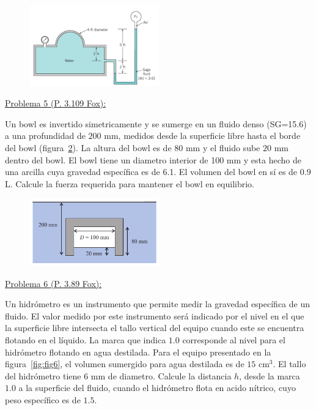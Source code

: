 \documentclass[11pt]{report}
\begin{document}
\begin{figure}[H]
\centering\includegraphics[width=0.5\textwidth]{p4.png}
\caption{\label{fig:fig4} }
\end{figure}




\vspace{0.5cm}
\underline {Problema 5 (P. 3.109 Fox):}
\vspace{0.2cm}

Un bowl es invertido simetricamente y se sumerge en un fluido denso (SG=15.6) a una profundidad de $200$ mm, medidos desde la superficie libre hasta el borde del bowl (figura~\ref{fig:fig5}). La altura del bowl es de $80$ mm y el fluido sube $20$ mm dentro del bowl. El bowl tiene un diametro interior de 100 mm y esta hecho de una arcilla cuya gravedad espec\'ifica es de 6.1. El volumen del bowl en s\'i es de 0.9 L. Calcule la fuerza requerida para mantener el bowl en equilibrio. 

\begin{figure}[H]
\centering\includegraphics[width=0.5\textwidth]{p5.png}
\caption{\label{fig:fig5} }
\end{figure}

\newpage

\vspace{0.5cm}
\underline {Problema 6 (P. 3.89 Fox):}
\vspace{0.2cm}

Un hidr\'ometro es un instrumento que permite medir la gravedad espec\'ifica de un fluido. El valor medido por este instrumento ser\'a indicado por el nivel en el que la superficie libre intersecta el tallo vertical del equipo cuando este se encuentra flotando en el l\'iquido. La marca que indica $1.0$ corresponde al nivel para el hidr\'ometro flotando en agua destilada. Para el equipo presentado en la figura~\ref{fig:fig6}, el volumen sumergido para agua destilada es de $15$ cm$^3$. El tallo del hidr\'ometro tiene $6$ mm de diametro. Calcule la distancia $h$, desde la marca $1.0$ a la superficie del fluido, cuando el hidr\'ometro flota en acido n\'itrico, cuyo peso espec\'ifico es de $1.5$.
\end{document}

